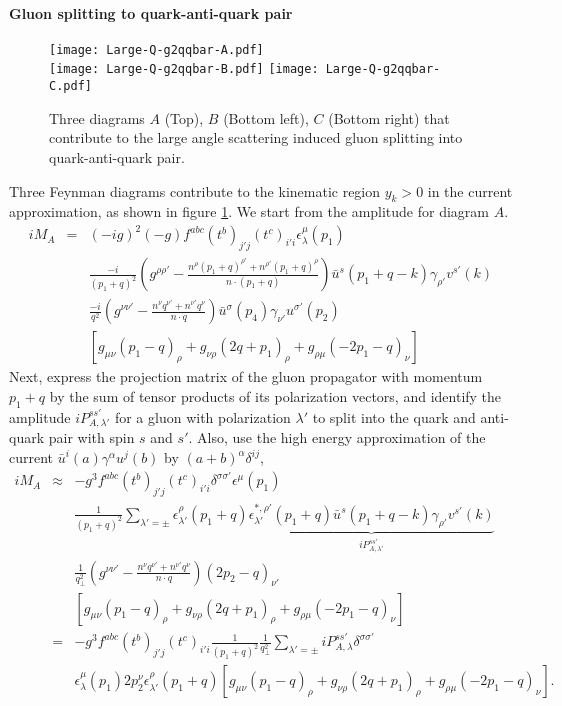\paragraph*{Gluon splitting to quark-anti-quark pair}
\begin{figure}
\centering
\texttt{[image: Large-Q-g2qqbar-A.pdf]}\\
\vspace{1em}
\texttt{[image: Large-Q-g2qqbar-B.pdf]}\hfill
\texttt{[image: Large-Q-g2qqbar-C.pdf]}
\caption{Three diagrams $A$ (Top), $B$ (Bottom left), $C$ (Bottom right) that contribute to the large angle scattering induced gluon splitting into quark-anti-quark pair.}
\label{fig:feyn-g2qqbar}
\end{figure}

Three Feynman diagrams contribute to the kinematic region $y_k >0$ in the current approximation, as shown in figure \ref{fig:feyn-g2qqbar}.
We start from the amplitude for diagram $A$.
\begin{eqnarray}
i M_A &=& (-ig)^2(-g)f^{abc}(t^b)_{j'j}(t^c)_{i'i} \epsilon_\lambda^\mu(p_1) \\\nonumber
&&\frac{-i}{(p_1+q)^2}\left(g^{\rho\rho'}-\frac{n^{\rho}(p_1+q)^{\rho'}+n^{\rho'}(p_1+q)^\rho}{n\cdot (p_1+q)}\right) \bar{u}^s(p_1+q-k)\gamma_{\rho'}v^{s'}(k) \\ \nonumber
&&\frac{-i}{q^2}\left(g^{\nu\nu'}-\frac{n^{\nu}q^{\nu'}+n^{\nu'}q^\nu}{n\cdot q}\right) \bar{u}^{\sigma}(p_4)\gamma_{\nu'}u^{\sigma'}(p_2) \\ \nonumber
&& \left[g_{\mu\nu}(p_1-q)_\rho + g_{\nu\rho}(2q+p_1)_\rho + g_{\rho\mu}(-2p_1 -q)_\nu \right]
\end{eqnarray}
Next, express the projection matrix of the gluon propagator with momentum $p_1+q$ by the sum of tensor products of its polarization vectors, and identify the amplitude $iP_{A,\lambda'}^{ss'}$ for a gluon with polarization $\lambda'$ to split into the quark and anti-quark pair with spin $s$ and $s'$.
Also, use the high energy approximation of the current $\bar{u}^i(a)\gamma^\alpha u^j(b)$ by $(a+b)^\alpha \delta^{ij}$,
\begin{eqnarray}
i M_A &\approx& -g^3 f^{abc}(t^b)_{j'j}(t^c)_{i'i} \delta^{\sigma\sigma'} \epsilon^\mu(p_1) \\\nonumber
&&\frac{1}{(p_1+q)^2} \sum_{\lambda'=\pm}\epsilon_{\lambda'}^{\rho}(p_1+q)\underbrace{\epsilon_{\lambda'}^{*,\rho'}(p_1+q) \bar{u}^s(p_1+q-k)\gamma_{\rho'}v^{s'}(k)}_{iP_{A,\lambda'}^{ss'}} \\ \nonumber
&&\frac{1}{q_\perp^2}\left(g^{\nu\nu'}-\frac{n^{\nu}q^{\nu'}+n^{\nu'}q^\nu}{n\cdot q}\right) (2p_2-q)_{\nu'} \\ \nonumber
&& \left[g_{\mu\nu}(p_1-q)_\rho + g_{\nu\rho}(2q+p_1)_\rho + g_{\rho\mu}(-2p_1 -q)_\nu \right] \\
&=& -g^3 f^{abc}(t^b)_{j'j}(t^c)_{i'i} \frac{1}{(p_1+q)^2}\frac{1}{q_\perp^2} \sum_{\lambda'=\pm}iP_{A,\lambda}^{ss'} \delta^{\sigma\sigma'}  \\ \nonumber
&& \epsilon_\lambda^\mu(p_1)2p_2^{\nu} \epsilon_{\lambda'}^{\rho}(p_1+q) \left[g_{\mu\nu}(p_1-q)_\rho + g_{\nu\rho}(2q+p_1)_\rho + g_{\rho\mu}(-2p_1 -q)_\nu \right].
\end{eqnarray}
